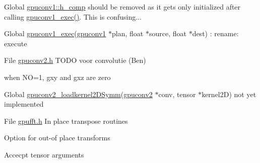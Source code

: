 \label{todo__todo000005}
\hypertarget{todo__todo000005}{}
 
\begin{DoxyDescription}
\item[Global \hyperlink{structgpuconv1_ad52d94894299e1553a8c8642be29172a}{gpuconv1::h\_\-comp} ]should be removed as it gets only initialized after calling \hyperlink{gpuconv1_8h_a290a0200b1639a156c1767f74bf5b94e}{gpuconv1\_\-exec()}. This is confusing... 
\end{DoxyDescription}

\label{todo__todo000003}
\hypertarget{todo__todo000003}{}
 
\begin{DoxyDescription}
\item[Global \hyperlink{gpuconv1_8h_a290a0200b1639a156c1767f74bf5b94e}{gpuconv1\_\-exec}(\hyperlink{structgpuconv1}{gpuconv1} $\ast$plan, float $\ast$source, float $\ast$dest) ]: rename: execute 
\end{DoxyDescription}

\label{todo__todo000006}
\hypertarget{todo__todo000006}{}
 
\begin{DoxyDescription}
\item[File \hyperlink{gpuconv2_8h}{gpuconv2.h} ]TODO voor convolutie (Ben)



when NO=1, gxy and gxz are zero


\end{DoxyDescription}

\label{todo__todo000008}
\hypertarget{todo__todo000008}{}
 
\begin{DoxyDescription}
\item[Global \hyperlink{gpuconv2_8h_a9846e091be7ddd707f1325cd50d0c455}{gpuconv2\_\-loadkernel2DSymm}(\hyperlink{structgpuconv2}{gpuconv2} $\ast$conv, tensor $\ast$kernel2D) ]not yet implemented 
\end{DoxyDescription}

\label{todo__todo000009}
\hypertarget{todo__todo000009}{}
 
\begin{DoxyDescription}
\item[File \hyperlink{gpufft_8h}{gpufft.h} ]In place transpose routines 

Option for out-\/of place transforms 

Accecpt tensor arguments


\end{DoxyDescription}

